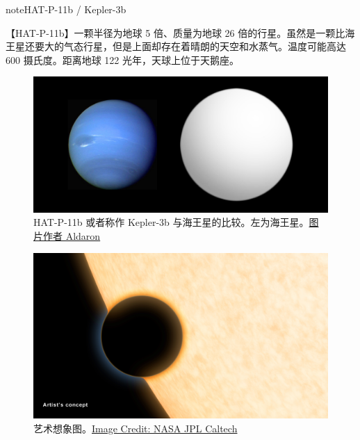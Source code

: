 \documentclass[letterpaper,10pt,english]{sphinxmanual}
\begin{document}
\begin{notice}{note}{HAT-P-11b / Kepler-3b}

【HAT-P-11b】一颗半径为地球 5 倍、质量为地球 26 倍的行星。虽然是一颗比海王星还要大的气态行星，但是上面却存在着晴朗的天空和水蒸气。温度可能高达 600 摄氏度。距离地球 122 光年，天球上位于天鹅座。
\begin{figure}[htbp]
\centering
\capstart

\includegraphics{Exoplanet_Comparison_HAT-P-11_b.png}
\caption{HAT-P-11b 或者称作 Kepler-3b 与海王星的比较。左为海王星。\href{https://commons.wikimedia.org/wiki/File:Exoplanet\_Comparison\_HAT-P-11\_b.png}{图片作者 Aldaron}}\end{figure}
\begin{figure}[htbp]
\centering
\capstart

\includegraphics{hat-p-11b.jpg}
\caption{艺术想象图。\href{http://www.nasa.gov/press/2014/september/nasa-telescopes-find-clear-skies-and-water-vapor-on-exoplanet/}{Image Credit: NASA JPL Caltech}}\end{figure}
\begin{figure}[htbp]
\centering
\capstart


\end{figure}
\end{notice}
\end{document}
